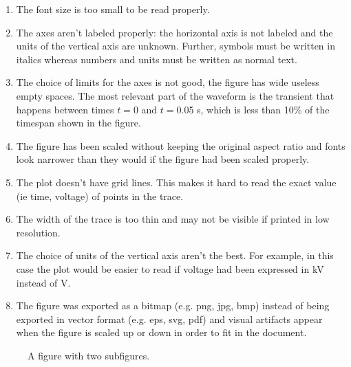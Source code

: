 \begin{enumerate}
    \item The font size is too small to be read properly.
    \item The axes aren't labeled properly: the horizontal axis is not labeled and the units of the vertical axis are unknown. Further, symbols must be written in italics whereas numbers and units must be written as normal text.
    \item The choice of limits for the axes is not good, the figure has wide useless empty spaces. The most relevant part of the waveform is the transient that happens between times $t=$0 and $t=$0.05 s, which is less than 10\% of the timespan shown in the figure.
    \item The figure has been scaled without keeping the original aspect ratio and fonts look narrower than they would if the figure had been scaled properly.
    \item The plot doesn't have grid lines. This makes it hard to read the exact value (ie time, voltage) of points in the trace.
    \item The width of the trace is too thin and may not be visible if printed in low resolution.
    \item The choice of units of the vertical axis aren't the best. For example, in this case the plot would be easier to read if voltage had been expressed in kV instead of V.
    \item The figure was exported as a bitmap (e.g. png, jpg, bmp) instead of being exported in vector format (e.g. eps, svg, pdf) and visual artifacts appear when the figure is scaled up or down in order to fit in the document.
\end{enumerate}

\begin{figure}[htbp]
	\centering
	\caption{A figure with two subfigures.}
	\label{fig:fig2}
\end{figure}

